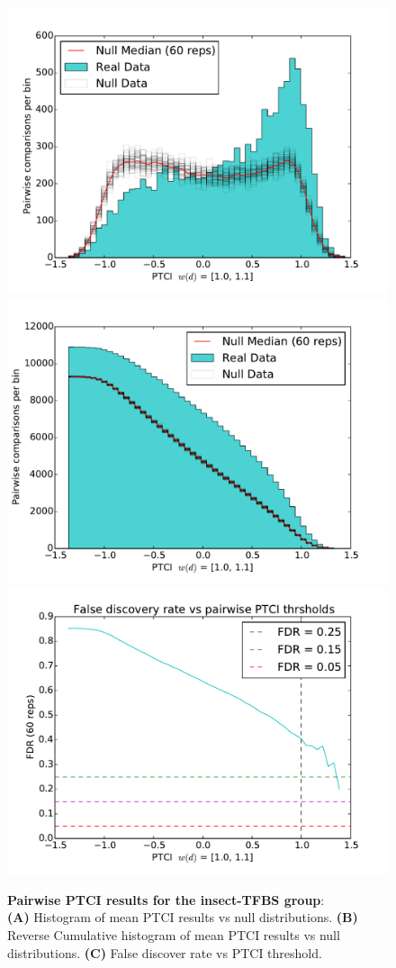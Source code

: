 
\begin{figure}[hp]
%
\subcaptionbox{\label{fig:insect-pair-ptci-hists-base}}
{\includegraphics[width=.5\linewidth]{figures/figs/jaspar_insect_ptci_20130918_orthodb7/pairwise_ptci_hist.pdf}}
% 
\subcaptionbox{\label{fig:insect-pair-ptci-hists-rcum-hist}}
{\includegraphics[width=.5\linewidth]{figures/figs/jaspar_insect_ptci_20130918_orthodb7/pairwise_ptci_cum_hist.pdf}}
% 
\subcaptionbox{\label{fig:insect-pair-ptci-hists-fdr}}
{\includegraphics[width=.5\linewidth]{figures/figs/jaspar_insect_ptci_20130918_orthodb7/pairwise_ptci_fdr.pdf}}
% 
% 
\caption[Pairwise insect-PTCI results]{\sf \textbf{Pairwise PTCI results for the insect-\gls{TFBS} group}:\\
\textbf{(A)} Histogram of mean PTCI results vs null distributions.
\textbf{(B)} Reverse Cumulative histogram of mean PTCI results vs null distributions.
\textbf{(C)} False discover rate vs PTCI threshold.}
\label{fig:insect-pair-ptci-hists}
\end{figure}